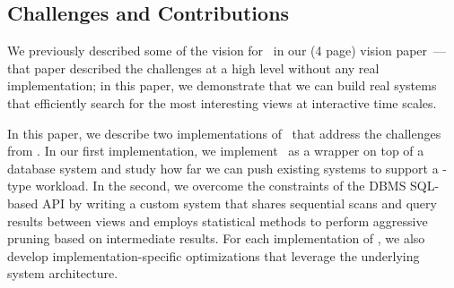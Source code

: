 \subsection*{Challenges and Contributions}

We previously described some of the vision for  \VizRecDB\ in our (4 page)
vision paper~\cite{DBLP:conf/vldb/Parameswaran2013}---that paper described the
challenges at a high level without any real implementation; in this paper, we
demonstrate that we can build real systems that efficiently search for the most
interesting views at interactive time scales.

In this paper, we describe two implementations of \VizRecDB\ that address the
challenges from \cite{DBLP:conf/vldb/Parameswaran2013}.
In our first implementation, we implement \VizRecDB\ as a wrapper on top of a
database system and study how far we can push existing systems to support a
\VizRecDB-type workload.
In the second, we overcome the constraints of the DBMS SQL-based API by writing a custom system
that  shares sequential scans and query results between views and employs statistical methods to 
perform aggressive pruning
based on intermediate results.
For each implementation of \VizRecDB, we also develop implementation-specific
optimizations that leverage the underlying system architecture.

